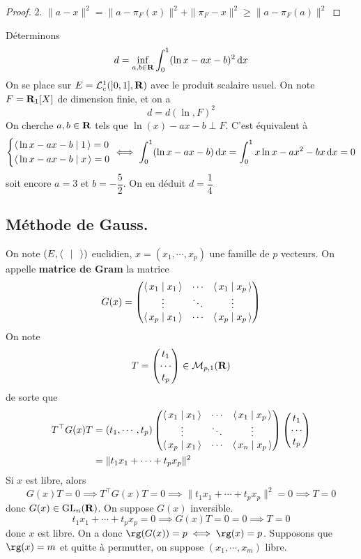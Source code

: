\begin{proof}
    2. $\|a-x\|^2 =\|a-\pi_F(x)\|^2 + \|\pi_F-x\|^2 \geq \|a-\pi_F(a)\|^2 $
\end{proof}

\begin{ex}
Déterminons \[
    d=\inf_{a, b \in  \mathbf R}\int_0^1 (\ln x-ax-b)^2 \mathop{}\!\mathrm d x
\] 
On se place sur $E=\mathcal  L_c^1(]0, 1], \mathbf R)$ avec le produit scalaire usuel. On note $F=\mathbf R_1[X]$ de dimension finie, et on a \[
    d=d(\ln, F)^2
\] 
On cherche $a, b \in  \mathbf R$ tels que $\ln(x)-ax-b\perp F$. C'est équivalent à  \[
\begin{dcases}
    \scalar{\ln x - ax - b}{1} =0 \\
    \scalar{\ln x - ax - b}{x} =0
\end{dcases}
\iff  \int_0^1(\ln x-ax-b)\diff x=\int_0^1 x\ln x-ax^2 -bx\diff x=0
\] 
soit encore $a=3$ et  $b=-\dfrac{5}{2}$. On en déduit $d=\dfrac{1}{4}$
\end{ex}

\subsection{Méthode de Gauss.}
On note $(E, \scalar{\;}{\;} )$ euclidien, $x=(x_1, \cdots , x_p)$ une famille de $p$ vecteurs. On appelle \textbf{matrice de Gram} la matrice \[
    G(x)= \begin{pmatrix}
        \scalar{x_1}{x_1} & \cdots & \scalar{x_1}{x_p} \\
        \vdots & \ddots & \vdots \\
        \scalar{x_p}{x_1} & \cdots  & \scalar{x_p}{x_p} 
    \end{pmatrix}
\] 
On note \[
T= \begin{pmatrix}
    t_1 \\ \cdots \\ t_p
\end{pmatrix} \in  \mathcal  M_{p,1}(\mathbf R)
\] 
de sorte que \begin{align*}
    T^\top G(x)T&=(t_1, \cdots , t_p) \begin{pmatrix}
        \scalar{x_1}{x_1} & \cdots & \scalar{x_1}{x_p} \\
        \vdots & \ddots & \vdots \\
        \scalar{x_p}{x_1} & \cdots  & \scalar{x_n}{x_p} 
    \end{pmatrix}\begin{pmatrix}
    t_1 \\ \cdots \\ t_p
\end{pmatrix} \\ &= \|t_1x_1+\cdots +t_px_p\|^2 
\end{align*}
Si $x$ est libre, alors \[
    G(x)T=0 \implies T^\top G(x)T=0 \implies \|t_1x_1+\cdots +t_px_p\|^2 =0 \implies T=0
\] 
donc $G(x) \in  \mathrm{GL}_n(\mathbf R)$. On suppose $G(x)$ inversible.  \[
    t_1x_1+\cdots +t_px_p=0 \implies G(x)T=0=0\implies T=0
\] 
donc $x$ est libre. On a donc $\rg(G(x))=p \iff  \rg(x)=p$. Supposons que $\rg(x)=m$ et quitte à permutter, on suppose  $(x_1, \cdots , x_m)$ libre.

